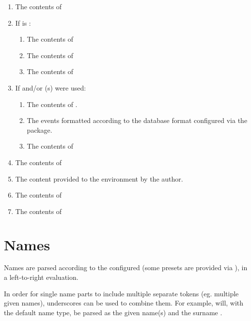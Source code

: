\documentclass[
	a4paper,
]{article}
\begin{document}
\begin{enumerate}[noitemsep]

\item The contents of 

\item If  is :
	\begin{enumerate}[noitemsep]
	\item The contents of 
	\item The contents of 
	\item The contents of 
	\end{enumerate}

\item If  and/or (s) were used:
	\begin{enumerate}[noitemsep]
	\item The contents of .
	\item The events formatted according to the database format configured via the  package.
	\item The contents of 
	\end{enumerate}

\item The contents of 
\item The content provided to the environment by the author.
\item The contents of 

\item The contents of 

\end{enumerate}


\section{Names} %

\label{sec:nameparsing}
Names are parsed according to the configured  (some presets are provided via ), in a left-to-right evaluation.

In order for single name parts to include multiple separate tokens (eg. multiple given names), underscores can be used to combine them. For example,  will, with the default  name type, be parsed as the given name(s)  and the surname .
\end{document}
